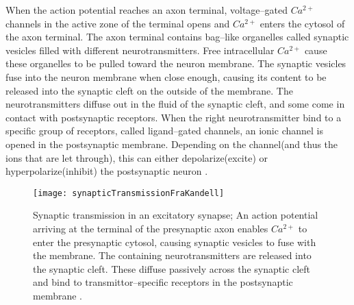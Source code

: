 		When the action potential reaches an axon terminal, voltage--gated $Ca^{2+}$ channels in the active zone of the terminal opens and $Ca^{2+}$ enters the cytosol of the axon terminal.
		The axon terminal contains bag--like organelles called synaptic vesicles filled with different neurotransmitters.
		Free intracellular $Ca^{2+}$ cause these organelles to be pulled toward the neuron membrane.
		The synaptic vesicles fuse into the neuron membrane when close enough, causing its content to be released into the synaptic cleft on the outside of the membrane.
		The neurotransmitters diffuse out in the fluid of the synaptic cleft, and some come in contact with postsynaptic receptors. 
		When the right neurotransmitter bind to a specific group of receptors, called ligand--gated channels, an ionic channel is opened in the postsynaptic membrane.
		Depending on the channel(and thus the ions that are let through), this can either depolarize(excite) or hyperpolarize(inhibit) the postsynaptic neuron%
		\cite{PrinciplesOfNeuralScience4edKAP10}.

\begin{figure}[hbt!p]
    \centering
    \texttt{[image: synapticTransmissionFraKandell]}	%
 	  \caption[Synaptic transmission in an excitatory synapse]
			{Synaptic transmission in an excitatory synapse; 
			An action potential arriving at the terminal of the presynaptic axon enables $Ca^{2+}$ to enter the presynaptic cytosol, causing synaptic vesicles to fuse with the membrane.
			The containing neurotransmitters are released into the synaptic cleft.
		 	These diffuse passively across the synaptic cleft and bind to transmittor--specific receptors in the postsynaptic membrane
			\cite{PrinciplesOfNeuralScience4edKAP10}.
			}
    \label{figSynapticTransmissionInExitatorySynapse}
\end{figure}


